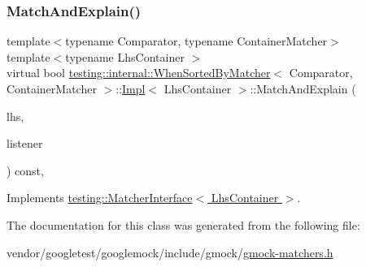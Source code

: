 \subsubsection{\texorpdfstring{Match\+And\+Explain()}{MatchAndExplain()}}
{\footnotesize\ttfamily template$<$typename Comparator, typename Container\+Matcher$>$ \\
template$<$typename Lhs\+Container $>$ \\
virtual bool \hyperlink{classtesting_1_1internal_1_1_when_sorted_by_matcher}{testing\+::internal\+::\+When\+Sorted\+By\+Matcher}$<$ Comparator, Container\+Matcher $>$\+::\hyperlink{classtesting_1_1internal_1_1_when_sorted_by_matcher_1_1_impl}{Impl}$<$ Lhs\+Container $>$\+::Match\+And\+Explain (\begin{DoxyParamCaption}\item[{Lhs\+Container}]{lhs,  }\item[{\hyperlink{classtesting_1_1_match_result_listener}{Match\+Result\+Listener} $\ast$}]{listener }\end{DoxyParamCaption}) const\hspace{0.3cm}{\ttfamily [inline]}, {\ttfamily [virtual]}}



Implements \hyperlink{classtesting_1_1_matcher_interface_a296b43607cd99d60365f0e6a762777cf}{testing\+::\+Matcher\+Interface$<$ Lhs\+Container $>$}.



The documentation for this class was generated from the following file\+:\begin{DoxyCompactItemize}
\item 
vendor/googletest/googlemock/include/gmock/\hyperlink{gmock-matchers_8h}{gmock-\/matchers.\+h}\end{DoxyCompactItemize}
